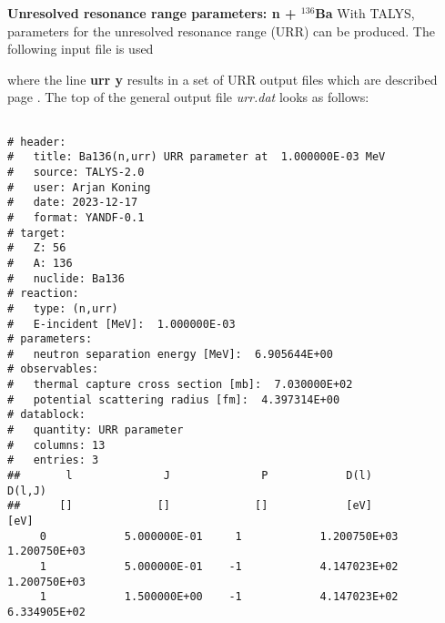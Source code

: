 \begin{samplecase}
{\bf Unresolved resonance range parameters: n + ${}^{136}$Ba}\newline
With TALYS, parameters for the unresolved resonance range (URR) can be produced.
The following input file is used


where the line {\bf urr y} results in a set of URR output files which are
described page \pageref{key:urr}. The top of the general output file {\em urr.dat}
looks as follows:
{\small \begin{verbatim}

# header:
#   title: Ba136(n,urr) URR parameter at  1.000000E-03 MeV
#   source: TALYS-2.0
#   user: Arjan Koning
#   date: 2023-12-17
#   format: YANDF-0.1
# target:
#   Z: 56
#   A: 136
#   nuclide: Ba136
# reaction:
#   type: (n,urr)
#   E-incident [MeV]:  1.000000E-03
# parameters:
#   neutron separation energy [MeV]:  6.905644E+00
# observables:
#   thermal capture cross section [mb]:  7.030000E+02
#   potential scattering radius [fm]:  4.397314E+00
# datablock:
#   quantity: URR parameter
#   columns: 13
#   entries: 3
##       l              J              P            D(l)          D(l,J)       
##      []             []             []            [eV]           [eV]       
     0            5.000000E-01     1            1.200750E+03   1.200750E+03  
     1            5.000000E-01    -1            4.147023E+02   1.200750E+03  
     1            1.500000E+00    -1            4.147023E+02   6.334905E+02  
\end{verbatim} } \renewcommand{\baselinestretch}{1.07}\small\normalsize
\noindent
\end{samplecase}
